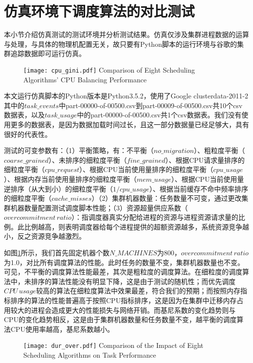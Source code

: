 \section{仿真环境下调度算法的对比测试}

本小节介绍仿真测试的测试环境并分析测试结果。仿真仅涉及集群进程数据的运算与处理，与具体的物理机配置无关，故只要有Python脚本的运行环境与谷歌的集群追踪数据即可运行仿真。

\begin{figure}[!htp]
  \centering
  \texttt{[image: cpu\_gini.pdf]}
    {Comparison of Eight Scheduling Algorithms' CPU Balancing Performance}
  \label{fig:cpu_gini}
\end{figure}
本文运行仿真脚本的Python版本是Python3.5.2，使用了Google clusterdata-2011-2其中的$task\_events$中part-00000-of-00500.csv到part-00009-of-00500.csv共10个csv数据表，以及$task\_usage$中的part-00000-of-00500.csv共1个csv数据表。我们没有使用更多的数据表，是因为数据加载时间过长，且这一部分数据量已经足够大，具有很好的代表性。

测试的可变参数有：（1）平衡策略，有：不平衡（$no\_migration$）、粗粒度平衡（$coarse\_grained$）、未排序的细粒度平衡（$fine\_grained$）、根据CPU请求量排序的细粒度平衡（$cpu\_request$）、根据CPU当前使用量排序的细粒度平衡（$cpu\_usage$）、根据内存当前使用量排序的细粒度平衡（$mem\_usage$）、根据CPU当前使用量逆排序（从大到小）的细粒度平衡（$1/cpu\_usage$）、根据当前缓存不命中频率排序的细粒度平衡（$cache\_misses$）（2）集群机器数量：任务数量不可变，通过更改集群机器数量配置测试调度脚本性能；（3）资源超量供应系数（$overcommitment\,ratio$）：指调度器真实分配给进程的资源与进程资源请求量的比例。此比例越高，则表明调度器给每个进程提供的超额资源越多，系统资源竞争越小，反之资源竞争越激烈。

如图\ref{fig:cpu_gini}所示，我们首先固定机器个数$N\_MACHINES$为800，$overcommitment\,ratio$为1.0，对比所有调度算法的性能。此时任务的数量不变，集群机器数量也不变。可见，不平衡的调度算法性能最差，其次是粗粒度的调度算法。在细粒度的调度算法中，未排序的算法性能没有明显下降，这是由于测试的随机性；而优先调度$CPU\,usage$较高的算法在细粒度算法中效果最差，符合我们的预期；而按照内存指标排序的算法的性能普遍高于按照CPU指标排序，这是因为在集群中迁移内存占用较大的进程会造成更大的性能损失与网络开销。而基尼系数的变化趋势则与CPU的变化趋势相反，这是由于集群机器数量和任务数量不变，越平衡的调度算法CPU使用率越高，基尼系数越小。

\begin{figure}[!htp]
  \centering
  \texttt{[image: dur\_over.pdf]}
    {Comparison of the Impact of Eight Scheduling Algorithms on Task Performance}
  \label{fig:dur_over}
\end{figure}

